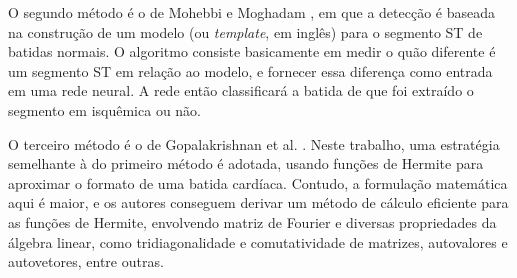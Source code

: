 O segundo método é o de Mohebbi e Moghadam \cite{Mohebbi07}, em que a detecção é baseada na construção de um modelo (ou \emph{template}, em inglês) para o segmento ST de batidas normais. O algoritmo consiste basicamente em medir o quão diferente é um segmento ST em relação ao modelo, e fornecer essa diferença como entrada em uma rede neural. A rede então classificará a batida de que foi extraído o segmento em isquêmica ou não.

O terceiro método é o de Gopalakrishnan et al. \cite{Gopalak04}. Neste trabalho, uma estratégia semelhante à do primeiro método é adotada, usando funções de Hermite para aproximar o formato de uma batida cardíaca. Contudo, a formulação matemática aqui é maior, e os autores conseguem derivar um método de cálculo eficiente para as funções de Hermite, envolvendo matriz de Fourier e diversas propriedades da álgebra linear, como tridiagonalidade e comutatividade de matrizes, autovalores e autovetores, entre outras.
